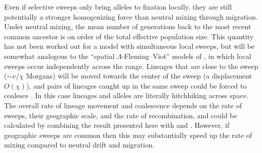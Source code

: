 \documentclass{article}
\newcommand{\plr}[1]{{\it\color{green}(#1)}}
\begin{document}
Even if selective sweeps only bring alleles to fixation locally,
they are still potentially a stronger homogenizing force
than neutral mixing through migration.
Under neutral mixing, the mean number of generations back to the most recent common ancestor
is on order of the total effective population size.
This quantity has not been worked out for a model with simultaneous local sweeps,
but will be somewhat analogous to the ``spatial $\Lambda$-Fleming--Viot'' models of \citet{barton2013modelling},
in which local sweeps occur independently across the range.
Lineages that are close to the sweep ($\sim v/\chi$ Morgans) will be moved
towards the center of the sweep (a displacement $O(\chi)$), 
and pairs of lineages caught up in the same sweep could be forced to coalesce 
\citep[see ][for work on geographic
hitchhiking]{barton2013genetic}. In this case lineages and alleles are literally
hitchhiking across space.
The overall rate of lineage movement and coalescence
depends on the rate of sweeps, their geographic scale, and the rate of recombination,
and could be calculated by combining the result presented here with
\citet{barton2013modelling} and \citet{barton2013genetic}. 
However, if geographic sweeps are common
then this may substantially speed up the rate of mixing compared to
neutral drift and migration. 

\end{document}
